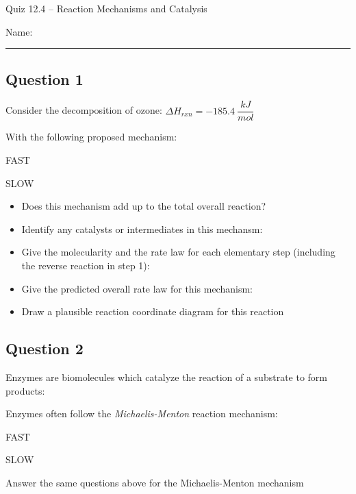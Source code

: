 \documentclass[11pt, letterpaper]{memoir}
\begin{document}
	\begin{center}
		{\large	Quiz 12.4 -- Reaction Mechanisms and Catalysis}
	\end{center}
	{\large Name: \rule[-1mm]{4in}{.1pt} 
	
	\noindent
	
	\subsection*{Question 1}
	Consider the decomposition of ozone:  \hspace{1em} $\Delta H_{rxn} = -185.4~\dfrac{kJ}{mol}$
	
	\noindent With the following proposed mechanism:
	
	 \hspace{1em} FAST
	
	 \hspace{1em} SLOW
	
	\begin{itemize}
		\item Does this mechanism add up to the total overall reaction?
		\item Identify any catalysts or intermediates in this mechansm:
		\item Give the molecularity and the rate law for each elementary step (including the reverse reaction in step 1):
		\item Give the predicted overall rate law for this mechanism:
		\item Draw a plausible reaction coordinate diagram for this reaction
	\end{itemize}
	
	\vspace{7em}
	\subsection*{Question 2}
	Enzymes are biomolecules which catalyze the reaction of a substrate to form products: 
	
	\noindent Enzymes often follow the \emph{Michaelis-Menton} reaction mechanism:
	
	 \hspace{1em} FAST
	
	 \hspace{1em} SLOW
	
	\noindent Answer the same questions above for the Michaelis-Menton mechanism
	\newpage
	\pagestyle{empty}
	\addtocounter{page}{-1}
}
\end{document}
